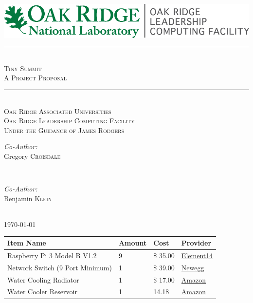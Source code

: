 \documentclass{article}
\begin{document}
\begin{titlepage}
 \addtolength{\topmargin}{-.5in}
 \center
 \includegraphics[scale=1.5]{OLCF_color.png}\\[2cm]
 \newcommand{\sep}{\rule{\linewidth}{0.5mm}}
 \sep \\[0.4cm]
 \textsc{\huge Tiny Summit}\\[0.4cm]
 \textsc{\large A Project Proposal}\\[0.4cm]
 \sep \\[2cm]
 \textsc{\LARGE Oak Ridge Associated Universities}\\[0.5cm]
 \textsc{\Large Oak Ridge Leadership Computing Facility}\\[0.5cm]
 \textsc{\large Under the Guidance of James Rodgers}\\[4.6cm]

 \begin{minipage}{0.4\textwidth}
 \begin{flushleft} \large
 \emph{Co-Author:}\\
Gregory \textsc{Croisdale}
 \end{flushleft}
 \end{minipage}
~
 \begin{minipage}{0.4\textwidth}
 \begin{flushright} \large
 \emph{Co-Author:} \\
Benjamin \textsc{Klein}
 \end{flushright}
 \end{minipage}\\[2cm]
 {\large \today}
 \vfill
\end{titlepage}

\begin{center}
    \center
    \begin{tabular}{ | l | l | l | p{5cm} |}
    \hline
    Item Name & Amount & Cost & Provider \\ \hline
	Raspberry Pi 3 Model B V1.2 & 9 & \$ 35.00 & \href{www.newark.com/raspberry-pi/rpi2-modb-v1-2/sbc-raspberry-pi-2-model-b-v1/dp/95Y1948?COM=superwidget-link_RaspberryPi}{Element14}\\ \hline
    Network Switch (9 Port Minimum) & 1 & \$ 39.00 & \href{https://www.newegg.com/Product/Product.aspx?item=N82E16833704087}{Newegg} \\ \hline
    Water Cooling Radiator & 1 & \$ 17.00 & \href{http://a.co/1dHksiW}{Amazon} \\ \hline
    Water Cooler Reservoir & 1 & 14.18 & \href{http://a.co/0tiCxUf}{Amazon} \\
    \hline
    \end{tabular}
\end{center}
\end{document}
